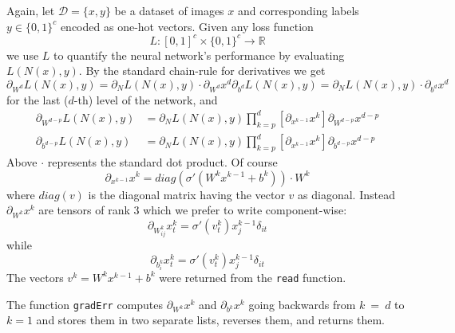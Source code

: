\documentclass [a4paper,12pt]{article}
\begin{document}
Again, let $\mathcal{D} = \{x, y\}$ be a dataset of images $x$ and corresponding labels $y \in \{0,1\}^c$ encoded as one-hot vectors. Given any loss function
$$
L: [0,1]^c \times \{0,1\}^c \longrightarrow \mathbb{R}
$$
we use $L$ to quantify the neural network's performance by evaluating $L(N(x),y)$.
By the standard chain-rule for derivatives we get
$$
\partial_{W^d} L(N(x), y) = \partial_N L(N(x),y) \cdot \partial_{W^d} x^d
\partial_{b^d} L(N(x), y) = \partial_N L(N(x),y) \cdot \partial_{b^d} x^d
$$
for the last ($d$-th) level of the network, and
\begin{align*}
\partial_{W^{d-p}} L(N(x), y) &= \partial_N L(N(x),y) \prod_{k=p}^{d} \left[ \partial_{x^{k-1}} x^k \right] \partial_{W^{d-p}} x^{d-p} \\
\partial_{b^{d-p}} L(N(x), y) &= \partial_N L(N(x),y) \prod_{k=p}^{d} \left[ \partial_{x^{k-1}} x^k \right] \partial_{b^{d-p}} x^{d-p}
\end{align*}
Above $\cdot$ represents the standard dot product. Of course
$$
\partial_{x^{k-1}} x^k = \textit{diag}( \sigma ' (W^k x^{k-1} + b^k) ) \cdot W^k
$$
where $\textit{diag}(v)$ is the diagonal matrix having the vector $v$ as diagonal.
Instead $\partial_{W^{k}} x^k$ are tensors of rank 3 which we prefer to write component-wise:
$$
\partial_{W^{k}_{ij}} x^k_t = \sigma ' (v^k_t) x^{k-1}_j \delta_{it}
$$
while
$$
\partial_{b^{k}_{i}} x^k_t = \sigma ' (v^k_t) x^{k-1}_j \delta_{it}
$$
The vectors $v^k = W^k x^{k-1} + b^k$ were returned from the \verb|read| function.

The function \verb|gradErr| computes $\partial_{W^{k}} x^k$ and $\partial_{b^{k}} x^k$ going backwards from $k~=~d$ to $k = 1$ and stores them in two separate lists, reverses them, and returns them.
\end{document}
